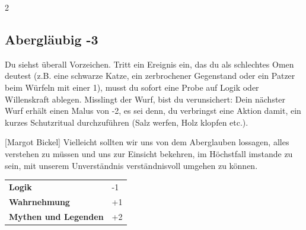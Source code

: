 \begin{multicols}{2}
\begin{tcolorbox}

\end{tcolorbox}

\begin{tcolorbox}
    \subsection*{Abergläubig \hfill \small{-3 }}
    \tcblower
Du siehst überall Vorzeichen. Tritt ein Ereignis ein, das du als schlechtes Omen deutest (z.B. eine schwarze Katze, ein zerbrochener Gegenstand oder ein Patzer beim Würfeln mit einer 1), musst du sofort eine Probe auf Logik oder Willenskraft ablegen. Misslingt der Wurf, bist du verunsichert: Dein nächster Wurf erhält einen Malus von -2, es sei denn, du verbringst eine Aktion damit, ein kurzes Schutzritual durchzuführen (Salz werfen, Holz klopfen etc.).

\begin{pquote}{[Margot Bickel]}
Vielleicht sollten wir uns von dem Aberglauben lossagen, alles verstehen zu müssen und uns zur Einsicht bekehren, im Höchstfall imstande zu sein, mit unserem Unverständnis verständnisvoll umgehen zu können.
\end{pquote}

\vspace{3mm}

\begin{tabular}{@{}ll@{}}
    \textbf{Logik} & -1\\
    \textbf{Wahrnehmung} & +1\\
    \textbf{Mythen und Legenden} & +2\\
\end{tabular}



\end{tcolorbox}
\end{multicols}
